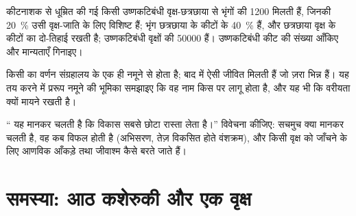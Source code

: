 \begin{exercise}[$\star\star\star$]\label{exo:b1:classifying-biodiversity:10}
कीटनाशक से धूम्रित की गई किसी उष्णकटिबंधी वृक्ष-छत्रछाया से भृंगों की
1200  मिलती हैं, जिनकी \qty{20}{\%} उसी वृक्ष-जाति के लिए विशिष्ट
हैं; भृंग छत्रछाया के कीटों के \qty{40}{\%} हैं, और छत्रछाया वृक्ष के
कीटों का दो-तिहाई रखती है; उष्णकटिबंधी वृक्षों की \num{50000} 
हैं। उष्णकटिबंधी कीट  की संख्या आँकिए और मान्यताएँ गिनाइए।
\end{exercise}

\begin{exercise}[$\star\star\star$]\label{exo:b1:classifying-biodiversity:11}
किसी  का वर्णन संग्रहालय के एक ही नमूने से होता है; बाद में ऐसी जीवित
 मिलती हैं जो ज़रा भिन्न हैं। यह तय करने में प्ररूप नमूने की
भूमिका समझाइए कि वह नाम किस पर लागू होता है, और यह भी कि वरीयता क्यों
मायने रखती है।
\end{exercise}

\begin{exercise}[$\star\star\star$]\label{exo:b1:classifying-biodiversity:12}
`` यह मानकर चलती है कि विकास सबसे छोटा रास्ता लेता है।''
विवेचना कीजिए:  सचमुच क्या मानकर चलती है, वह कब विफल होती है
(अभिसरण, तेज़ विकसित होते वंशक्रम), और किसी वृक्ष को जाँचने के लिए आणविक
आँकड़े तथा जीवाश्म कैसे बरते जाते हैं।
\end{exercise}

\section{समस्या: आठ कशेरुकी और एक वृक्ष}

